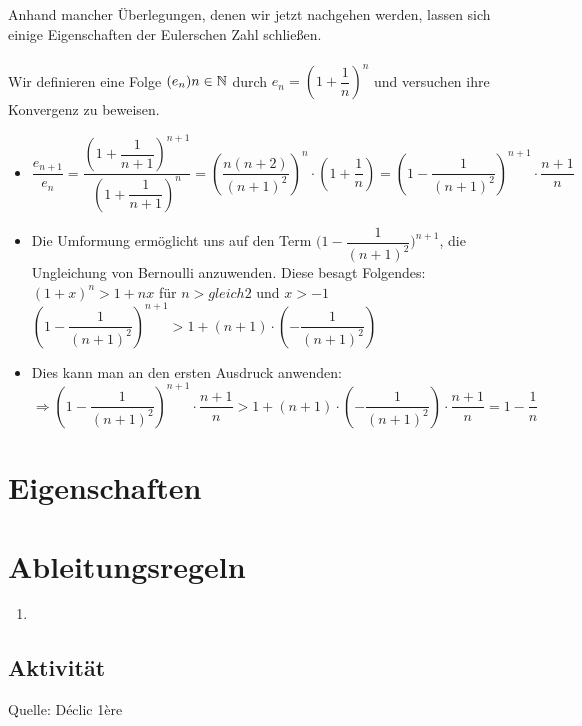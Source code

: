 Anhand mancher Überlegungen, denen wir jetzt nachgehen werden, lassen sich einige Eigenschaften der Eulerschen Zahl schließen.\\
\\ Wir definieren eine Folge $(e_{n})n\in\mathbb{N}$ durch $e_{n}=(1+\dfrac{1}{n})^n$ und versuchen ihre Konvergenz zu beweisen.
\begin{itemize}
\item$\dfrac{e_{n+1}}{e_{n}}=\dfrac{{(1+\dfrac{1}{n+1})}^{n+1}}{{(1+\dfrac{1}{n+1})}^{n}}=(\dfrac{n(n+2)}{(n+1)^2})^n\cdot(1+\dfrac{1}{n})=(1-\dfrac{1}{(n+1)^2})^{n+1}\cdot\dfrac{n+1}{n}$
\item Die Umformung ermöglicht uns auf den Term ${(1-\dfrac{1}{(n+1)^2}})^{n+1}$, die Ungleichung von Bernoulli anzuwenden. Diese besagt Folgendes: $(1+x)^n>1+nx$ für $n>gleich2$ und $x>-1$\\
$(1-\dfrac{1}{(n+1)^2})^{n+1}>1+(n+1)\cdot(-\dfrac{1}{(n+1)^2})$
\item Dies kann man an den ersten Ausdruck anwenden:\\
$\Rightarrow(1-\dfrac{1}{(n+1)^2})^{n+1}\cdot\dfrac{n+1}{n}>1+(n+1)\cdot(-\dfrac{1}{(n+1)^2})\cdot\dfrac{n+1}{n}=1-\dfrac{1}{n}$

\end{itemize}

		\section{Eigenschaften}
		\section{Ableitungsregeln}

\begin{enumerate}
\item 
\end{enumerate}
	\subsection{Aktivität}

Quelle: Déclic 1ère

